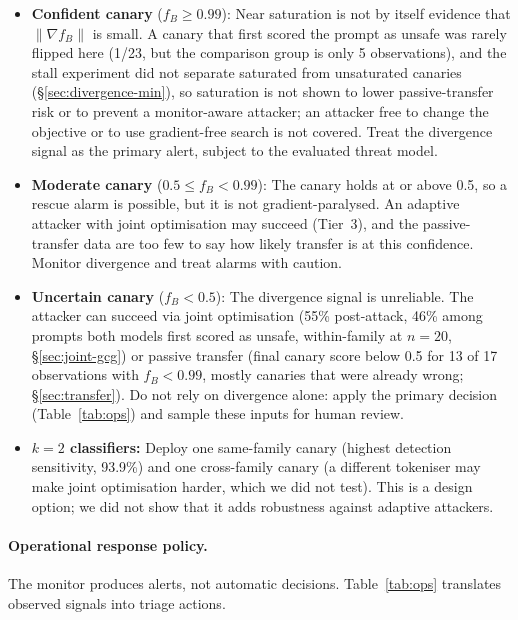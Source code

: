 \documentclass{article}
\begin{document}
\begin{itemize}
\item \textbf{Confident canary} ($f_B \geq 0.99$): Near saturation is not by itself evidence that $\|\nabla f_B\|$ is small. A canary that first scored the prompt as unsafe was rarely flipped here (1/23, but the comparison group is only 5 observations), and the stall experiment did not separate saturated from unsaturated canaries (\S\ref{sec:divergence-min}), so saturation is not shown to lower passive-transfer risk or to prevent a monitor-aware attacker; an attacker free to change the objective or to use gradient-free search is not covered. Treat the divergence signal as the primary alert, subject to the evaluated threat model.
\item \textbf{Moderate canary} ($0.5 \leq f_B < 0.99$): The canary holds at or above 0.5, so a rescue alarm is possible, but it is not gradient-paralysed. An adaptive attacker with joint optimisation may succeed (Tier~3), and the passive-transfer data are too few to say how likely transfer is at this confidence. Monitor divergence and treat alarms with caution.
\item \textbf{Uncertain canary} ($f_B < 0.5$): The divergence signal is unreliable. The attacker can succeed via joint optimisation (55\% post-attack, 46\% among prompts both models first scored as unsafe, within-family at $n{=}20$, \S\ref{sec:joint-gcg}) or passive transfer (final canary score below 0.5 for 13 of 17 observations with $f_B < 0.99$, mostly canaries that were already wrong; \S\ref{sec:transfer}). Do not rely on divergence alone: apply the primary decision (Table~\ref{tab:ops}) and sample these inputs for human review.
\item \textbf{$k = 2$ classifiers:} Deploy one same-family canary (highest detection sensitivity, 93.9\%) and one cross-family canary (a different tokeniser may make joint optimisation harder, which we did not test). This is a design option; we did not show that it adds robustness against adaptive attackers.
\end{itemize}

\paragraph{Operational response policy.} The monitor produces alerts, not automatic decisions. Table~\ref{tab:ops} translates observed signals into triage actions.
\end{document}
